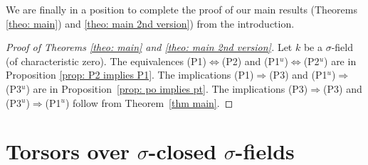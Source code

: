 \documentclass[oneside,reqno]{amsart}
\theoremstyle{definition}
\newcommand{\s}{\sigma}
\newcommand{\po}{{\rm{(P1$^u$)}}}
\newcommand{\pt}{{\rm{(P3$^u$)}}}
\newcommand{\pw}{{\rm{(P2$^u$)}}}
\newcommand{\poweak}{{\rm{(P1)}}}
\newcommand{\ptweak}{{\rm{(P3)}}}
\newcommand{\pwweak}{{\rm{(P2)}}}
\begin{document}
We are finally in a position to complete the proof of our main results (Theorems \ref{theo: main}) and \ref{theo: main 2nd version}) from the introduction.

\medskip

\begin{proof}[Proof of Theorems \ref{theo: main} and \ref{theo: main 2nd version}]
Let $k$ be a $\s$-field (of characteristic zero). The equivalences \poweak{}$\Leftrightarrow$\pwweak{} and \po{}$\Leftrightarrow$\pw{} are in Proposition \ref{prop: P2 implies P1}. The implications \poweak{}$\Rightarrow$\ptweak{} and \po{}$\Rightarrow$\pt{} are in Proposition~\ref{prop: po implies pt}. The implications \ptweak{}$\Rightarrow$\ptweak{} and \pt{}$\Rightarrow$\po{} follow from Theorem~\ref{thm main}.
\end{proof}

%
%








\section{Torsors over $\s$-closed $\s$-fields}
\label{sec: Torsors over sclosed sfields}
\end{document}
